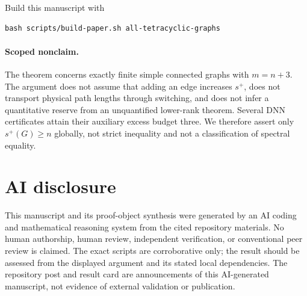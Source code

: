 \documentclass[11pt]{article}
\theoremstyle{remark}
\newcommand{\splus}{s^+}
\begin{document}
Build this manuscript with
\begin{verbatim}
bash scripts/build-paper.sh all-tetracyclic-graphs
\end{verbatim}

\paragraph{Scoped nonclaim.}
The theorem concerns exactly finite simple connected graphs with $m=n+3$.
The argument does not assume that adding an edge increases $\splus$, does not
transport physical path lengths through switching, and does not infer a
quantitative reserve from an unquantified lower-rank theorem.  Several DNN
certificates attain their auxiliary excess budget three.  We therefore assert
only $\splus(G)\geq n$ globally, not strict inequality and not a classification
of spectral equality.

\section*{AI disclosure}
This manuscript and its proof-object synthesis were generated by an AI coding
and mathematical reasoning system from the cited repository materials.  No
human authorship, human review, independent verification, or conventional
peer review is claimed.  The exact scripts are corroborative only; the result
should be assessed from the displayed argument and its stated local
dependencies.  The repository post and result card are announcements of this
AI-generated manuscript, not evidence of external validation or publication.
\end{document}
